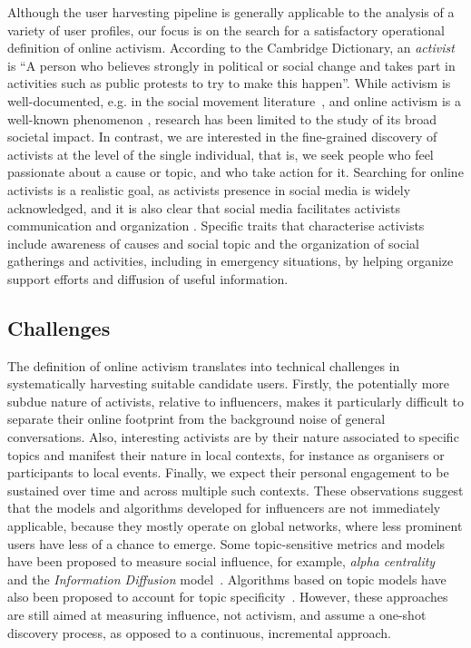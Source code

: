 Although the user harvesting pipeline is generally applicable to the analysis of a variety of user profiles, our focus is on the search for a satisfactory operational definition of online activism. 
%
According to the Cambridge Dictionary, an \textit{activist} is ``A person who believes strongly in political or social change and takes part in activities such as public protests to try to make this happen''.
%
While activism is well-documented, e.g. in the social movement literature~\cite{doi:10.1080/14742830701497277}, and online activism is a well-known phenomenon \cite{IJoC1246}, research has been limited to the study of its broad societal impact. 
In contrast, we are interested in the fine-grained discovery of activists at the level of the single individual, that is, we seek people who feel passionate about a cause or topic, and who take action for it. 
Searching for online activists is a realistic goal, as activists presence in social media is widely acknowledged, and it is also clear that social media facilitates activists communication and organization \cite{Poell2014,Youmans2012}. 
Specific traits that characterise activists include awareness of causes and social topic and the organization of social gatherings and activities, including in emergency situations, by helping organize support efforts and diffusion of useful information.

\subsection{Challenges}
 
The definition of online activism translates into technical challenges in systematically harvesting suitable candidate users.
%
Firstly, the potentially more subdue nature of activists, relative to influencers, makes it particularly difficult to separate their online footprint from the background noise of general conversations.
Also, interesting activists are by their nature associated to specific topics and manifest their nature in local contexts, for instance as organisers or participants to local events. 
Finally, we expect their personal engagement to be sustained over time and across multiple such contexts. 
These observations suggest that the models and algorithms developed for influencers are not immediately applicable, because they mostly operate on global networks, where less prominent users have less of a chance to emerge.
Some topic-sensitive metrics and models have been proposed to measure social influence, for example, \textit{alpha centrality}~\cite{Bonacich2001,Overbey2013} and the \textit{Information Diffusion} model~\cite{Pal2011}. Algorithms based on topic models have also been proposed to account for topic specificity~\cite{Zhao2011b}. However, these approaches are still aimed at measuring influence, not activism, and assume a one-shot discovery process, as opposed to a continuous, incremental approach.

